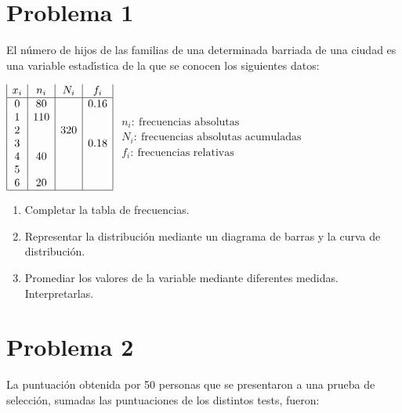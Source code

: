 \documentclass{article}
\begin{document}
	
	
	
	\section{Problema 1}
	\color{blue}
	El n{\'u}mero de hijos de las familias de una determinada
	barriada de una ciudad es una variable estad{\'\i}stica de la que se
	conocen los siguientes datos:
	
	\hskip 3cm $\begin{array}{|c|c|c|c|}
	x_{i} & n_{i} & N_{i} & f_{i}
	\\   \hline
	0 & 80  &     & 0\mbox{.}16 \\
	1 & 110 &     &      \\
	2 &     & 320 &      \\
	3 &     &     & 0\mbox{.}18 \\
	4 & 40  &     &      \\
	5 &     &     &      \\
	6 & 20  &     &  \\ \hline
	\end{array}$   \hskip 1.5cm $\begin{array}{l}  n_i: \ \mbox{frecuencias absolutas} \\ N_i:  \ \mbox{frecuencias absolutas acumuladas}\\ f_i:  \ \mbox{frecuencias relativas}\end{array}$
	\begin{enumerate}
		\item Completar la tabla de frecuencias.
		\item Representar la distribuci{\'o}n mediante un diagrama de
		barras y la curva de distribuci{\'o}n.
		\item Promediar los valores de la variable mediante diferentes
		medidas. Interpretarlas. \\
	\end{enumerate}
	
	\color{black}
	
	
	
	
	\section{Problema 2}
	\color{blue}
	La puntuaci{\'o}n obtenida por 50 personas que se presentaron a  una  prueba
	de selecci{\'o}n, sumadas las puntuaciones de los distintos tests, fueron:
	
\end{document}
